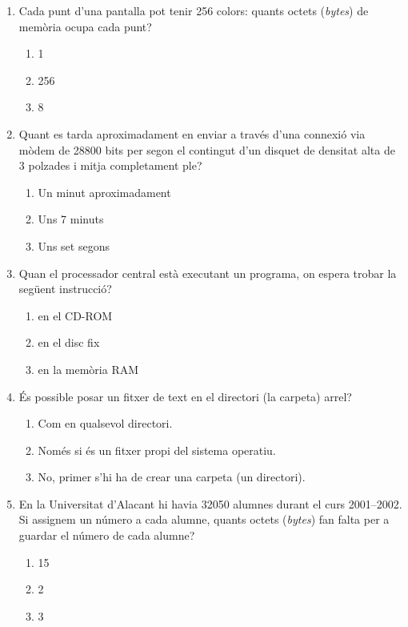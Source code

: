\begin{enumerate}
\item 
   Cada punt d'una pantalla pot tenir 256 colors: quants octets
   (\emph{bytes}) de
   memòria ocupa cada punt?
   
\begin{enumerate}
\item 1
\item 256
\item 8
\end{enumerate}

\item 
   Quant es tarda aproximadament en enviar a través d'una connexió
   via mòdem de 28800 bits per segon el contingut d'un disquet
   de densitat alta de 3 polzades i mitja completament ple?
   
\begin{enumerate}
\item Un minut aproximadament
\item Uns 7 minuts
\item Uns set segons
\end{enumerate}

\item Quan el processador central està executant un programa, on espera
  trobar la següent instrucció?
  
\begin{enumerate}
\item en el CD-ROM
\item en el disc fix
\item en la memòria RAM
\end{enumerate}

\item És possible posar un fitxer de text en el directori (la
  carpeta) arrel?
  
\begin{enumerate}
\item Com en qualsevol directori.
\item Només si és un fitxer propi del sistema operatiu.
\item No, primer s'hi ha de crear una carpeta (un directori).
\end{enumerate}

\item En la Universitat d'Alacant hi havia 32050 alumnes durant el
   curs 2001--2002. Si assignem un número a cada alumne, quants octets
   (\emph{bytes}) fan falta per a guardar el número de cada alumne?
   
\begin{enumerate}
\item 15
\item 2
\item 3
\end{enumerate}


\end{enumerate}
